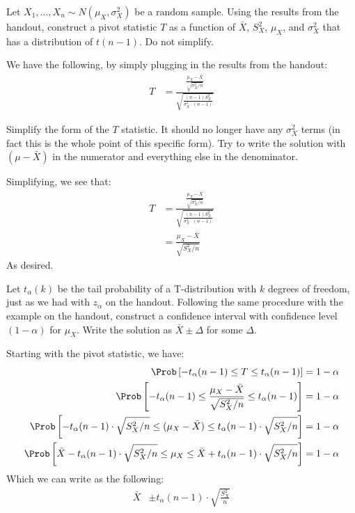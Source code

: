 
Let $X_1, \ldots, X_n \sim N(\mu_X, \sigma_X^2)$ be a random sample. Using
the results from the handout, construct a pivot statistic $T$ as a function
of $\bar{X}$, $S_X^2$, $\mu_X$, and $\sigma_X^2$ that has a distribution of
$t(n-1)$. Do not simplify.


We have the following, by simply plugging in the results from the handout:
\begin{align*}
T &= \frac{\frac{\mu_X - \bar{X}}{\sqrt{\sigma_X^2 / n}}}{\sqrt{\frac{(n-1)S^2_X}{\sigma_X^2 \cdot (n-1)}}}
\end{align*}


Simplify the form of the $T$ statistic. It should no longer have any
$\sigma_X^2$ terms (in fact this is the whole point of this specific form). 
Try to write the solution with $(\mu - \bar{X})$ in the numerator and
everything else in the denominator.


Simplifying, we see that:
\begin{align*}
T &= \frac{\frac{\mu_X - \bar{X}}{\sqrt{\sigma_X^2 / n}}}{\sqrt{\frac{(n-1)S^2_X}{\sigma_X^2 \cdot (n-1)}}} \\
&= \frac{\mu_X - \bar{X}}{\sqrt{S^2_X / n}}
\end{align*}
As desired.



Let $t_\alpha(k)$ be the tail probability of a T-distribution with $k$
degrees of freedom, just as we had with $z_\alpha$ on the handout. Following
the same procedure with the example on the handout, construct a confidence
interval with confidence level $(1 - \alpha)$ for $\mu_X$. Write the solution
as $\bar{X} \pm \Delta$ for some $\Delta$.


Starting with the pivot statistic, we have:
\begin{align*}
\Prob\left[ -t_\alpha(n-1) \leq T \leq t_\alpha(n-1) \right] &= 1 - \alpha \\
\Prob\left[ -t_\alpha(n-1) \leq \frac{\mu_X - \bar{X}}{\sqrt{S^2_X / n}} \leq t_\alpha(n-1) \right] &= 1 - \alpha \\
\Prob\left[ -t_\alpha(n-1) \cdot \sqrt{S^2_X / n} \leq (\mu_X - \bar{X}) \leq t_\alpha(n-1) \cdot \sqrt{S^2_X / n} \right] &= 1 - \alpha \\
\Prob\left[ \bar{X} - t_\alpha(n-1) \cdot \sqrt{S^2_X / n} \leq \mu_X \leq \bar{X} + t_\alpha(n-1) \cdot \sqrt{S^2_X / n} \right] &= 1 - \alpha \\
\end{align*}
Which we can write as the following:
\begin{align*}
\bar{X} &\pm t_\alpha(n-1) \cdot \sqrt{\frac{S^2_X}{n}}
\end{align*}

